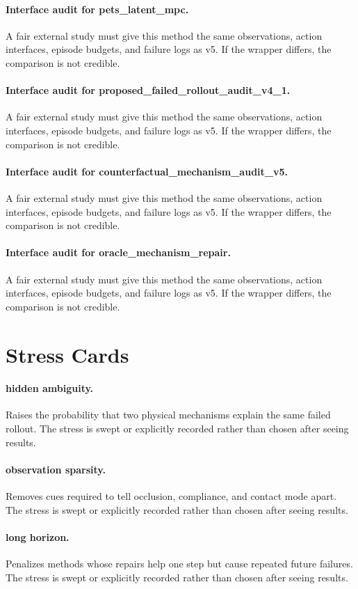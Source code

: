 \documentclass{article}
\begin{document}
\paragraph{Interface audit for pets\_latent\_mpc.} A fair external study must give this method the same observations, action interfaces, episode budgets, and failure logs as v5. If the wrapper differs, the comparison is not credible.
\paragraph{Interface audit for proposed\_failed\_rollout\_audit\_v4\_1.} A fair external study must give this method the same observations, action interfaces, episode budgets, and failure logs as v5. If the wrapper differs, the comparison is not credible.
\paragraph{Interface audit for counterfactual\_mechanism\_audit\_v5.} A fair external study must give this method the same observations, action interfaces, episode budgets, and failure logs as v5. If the wrapper differs, the comparison is not credible.
\paragraph{Interface audit for oracle\_mechanism\_repair.} A fair external study must give this method the same observations, action interfaces, episode budgets, and failure logs as v5. If the wrapper differs, the comparison is not credible.
\clearpage
\section{Stress Cards}
\paragraph{hidden ambiguity.} Raises the probability that two physical mechanisms explain the same failed rollout. The stress is swept or explicitly recorded rather than chosen after seeing results.
\paragraph{observation sparsity.} Removes cues required to tell occlusion, compliance, and contact mode apart. The stress is swept or explicitly recorded rather than chosen after seeing results.
\paragraph{long horizon.} Penalizes methods whose repairs help one step but cause repeated future failures. The stress is swept or explicitly recorded rather than chosen after seeing results.
\end{document}
